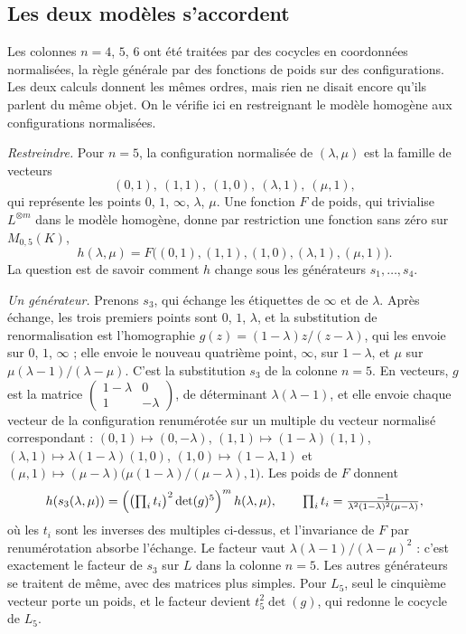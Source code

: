 \subsection*{Les deux modèles s'accordent}

Les colonnes $n = 4$, $5$, $6$ ont été traitées par des cocycles en coordonnées normalisées, la règle générale par des fonctions de poids sur des configurations. Les deux calculs donnent les mêmes ordres, mais rien ne disait encore qu'ils parlent du même objet. On le vérifie ici en restreignant le modèle homogène aux configurations normalisées.

\noindent\emph{Restreindre.} Pour $n = 5$, la configuration normalisée de $(\lambda, \mu)$ est la famille de vecteurs
\[
(0, 1),\ (1, 1),\ (1, 0),\ (\lambda, 1),\ (\mu, 1),
\]
qui représente les points $0$, $1$, $\infty$, $\lambda$, $\mu$. Une fonction $F$ de poids, qui trivialise $L^{\otimes m}$ dans le modèle homogène, donne par restriction une fonction sans zéro sur $M_{0,5}(K)$,
\[
h(\lambda, \mu) = F\bigl((0,1), (1,1), (1,0), (\lambda,1), (\mu,1)\bigr).
\]
 La question est de savoir comment $h$ change sous les générateurs $s_1, \ldots, s_4$.

\noindent\emph{Un générateur.} Prenons $s_3$, qui échange les étiquettes de $\infty$ et de $\lambda$. Après échange, les trois premiers points sont $0$, $1$, $\lambda$, et la substitution de renormalisation est l'homographie $g(z) = (1 - \lambda)z/(z - \lambda)$, qui les envoie sur $0$, $1$, $\infty$ ; elle envoie le nouveau quatrième point, $\infty$, sur $1 - \lambda$, et $\mu$ sur $\mu(\lambda - 1)/(\lambda - \mu)$. C'est la substitution $s_3$ de la colonne $n = 5$. En vecteurs, $g$ est la matrice $\begin{pmatrix} 1 - \lambda & 0 \\ 1 & -\lambda \end{pmatrix}$, de déterminant $\lambda(\lambda - 1)$, et elle envoie chaque vecteur de la configuration renumérotée sur un multiple du vecteur normalisé correspondant : $(0, 1) \mapsto (0, -\lambda)$, $(1, 1) \mapsto (1 - \lambda)(1, 1)$, $(\lambda, 1) \mapsto \lambda(1 - \lambda)(1, 0)$, $(1, 0) \mapsto (1 - \lambda, 1)$ et $(\mu, 1) \mapsto (\mu - \lambda)\bigl(\mu(1 - \lambda)/(\mu - \lambda), 1\bigr)$. Les poids de $F$ donnent
\[
h(s_3(\lambda, \mu)) = \Bigl(\bigl(\textstyle\prod_i t_i\bigr)^2 \det(g)^5\Bigr)^m\, h(\lambda, \mu),
\qquad \prod_i t_i = \frac{-1}{\lambda^2(1-\lambda)^2(\mu - \lambda)},
\]
où les $t_i$ sont les inverses des multiples ci-dessus, et l'invariance de $F$ par renumérotation absorbe l'échange. Le facteur vaut $\lambda(\lambda - 1)/(\lambda - \mu)^2$ : c'est exactement le facteur de $s_3$ sur $L$ dans la colonne $n = 5$. Les autres générateurs se traitent de même, avec des matrices plus simples. Pour $L_5$, seul le cinquième vecteur porte un poids, et le facteur devient $t_5^2 \det(g)$, qui redonne le cocycle de $L_5$.

